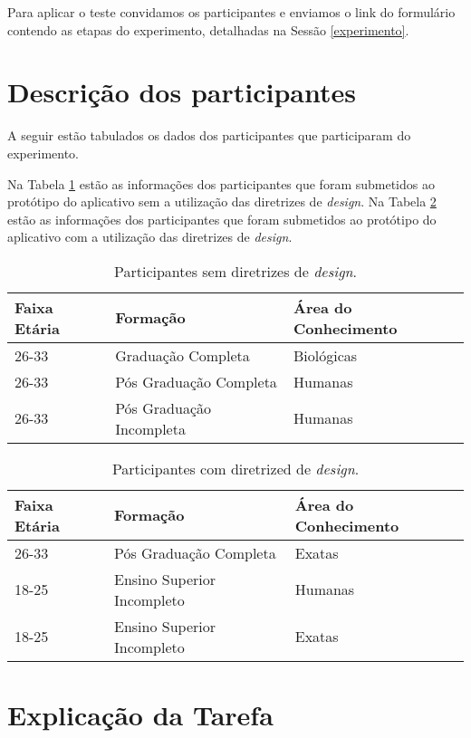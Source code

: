 \documentclass[12pt]{article}
\begin{document}
Para aplicar o teste convidamos os participantes e enviamos o link do formulário contendo as etapas do experimento, detalhadas na Sessão \ref{experimento}.

\section{Descrição dos participantes}

A seguir estão tabulados os dados dos participantes que participaram do experimento.

Na Tabela \ref{tab:no_guidelines} estão as informações dos participantes que foram submetidos ao protótipo do aplicativo sem a utilização das diretrizes de \textit{design}. Na Tabela \ref{tab:guidelines} estão as informações dos participantes que foram submetidos ao protótipo do aplicativo com a utilização das diretrizes de \textit{design}.

\begin{table}[!htb]
  \centering
	\begin{tabular}{|l|l|l|}
		\hline
		\textbf{Faixa Etária} & \textbf{Formação} & \textbf{Área do Conhecimento} \\ \hline
		26-33 & Graduação Completa & Biológicas \\ \hline
		26-33 & Pós Graduação Completa & Humanas \\ \hline
		26-33 & Pós Graduação Incompleta & Humanas \\ \hline
		\end{tabular}
  \caption{Participantes sem diretrizes de \textit{design}.}
  \label{tab:no_guidelines}
\end{table}

\begin{table}[!htb]
  \centering
	\begin{tabular}{|l|l|l|}
		\hline
		\textbf{Faixa Etária} & \textbf{Formação} & \textbf{Área do Conhecimento} \\ \hline
		26-33 & Pós Graduação Completa & Exatas \\ \hline
		18-25 & Ensino Superior Incompleto & Humanas \\ \hline
		18-25 & Ensino Superior Incompleto & Exatas \\ \hline
		\end{tabular}
  \caption{Participantes com diretrized de \textit{design}.}
  \label{tab:guidelines}
\end{table}

\section{Explicação da Tarefa}
\label{ap:explicacao}
\end{document}
